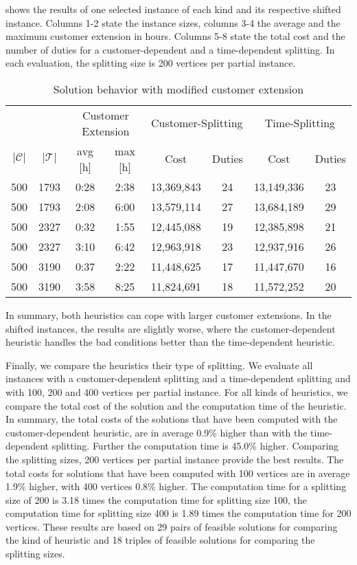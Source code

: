  shows the results of one selected instance of each kind and its respective shifted instance. Columns 1-2 state the instance sizes, columns 3-4 the average and the maximum customer extension in hours. Columns 5-8 state the total cost and the number of duties for a customer-dependent and a time-dependent splitting. In each evaluation, the splitting size is 200 vertices per partial instance.

\begin{table}[htb]
	\centering
	\begin{tabular}{cccc cc cc}
		\toprule
		&& \multicolumn{2}{c}{Customer Extension} & \multicolumn{2}{c}{Customer-Splitting} & \multicolumn{2}{c}{Time-Splitting} \\
		\cmidrule(r){3-8}
		$\vert\mathcal{C}\vert$ & $\vert\mathcal{T}\vert$ & avg [h] & max [h] & Cost & Duties & Cost & Duties \\
		\midrule
		500 & 1793 & 0:28 & 2:38 & 13,369,843 & 24 & 13,149,336 & 23 \\
		500 & 1793 & 2:08 & 6:00 & 13,579,114 & 27 & 13,684,189 & 29 \\
		500 & 2327 & 0:32 & 1:55 & 12,445,088 & 19 & 12,385,898 & 21 \\
		500 & 2327 & 3:10 & 6:42 & 12,963,918 & 23 & 12,937,916 & 26 \\
		500 & 3190 & 0:37 & 2:22 & 11,448,625 & 17 & 11,447,670 & 16 \\
		500 & 3190 & 3:58 & 8:25 & 11,824,691 & 18 & 11,572,252 & 20 \\
		\bottomrule
	\end{tabular}
	\caption{Solution behavior with modified customer extension}
	\label{tab:results:extension}
\end{table}

In summary, both heuristics can cope with larger customer extensions. In the shifted instances, the results are slightly worse, where the customer-dependent heuristic handles the bad conditions better than the time-dependent heuristic.

Finally, we compare the heuristics \wrt their type of splitting. We evaluate all instances with a customer-dependent splitting and a time-dependent splitting and with 100, 200 and 400 vertices per partial instance. For all kinds of heuristics, we compare the total cost of the solution and the computation time of the heuristic. In summary, the total costs of the solutions that have been computed with the customer-dependent heuristic, are in average 0.9\% higher than with the time-dependent splitting. Further the computation time is 45.0\% higher. Comparing the splitting sizes, 200 vertices per partial instance provide the best results. The total costs for solutions that have been computed with 100 vertices are in average 1.9\% higher, with 400 vertices 0.8\% higher. The computation time for a splitting size of 200 is 3.18 times the computation time for splitting size 100, the computation time for splitting size 400 is 1.89 times the computation time for 200 vertices. These results are based on 29 pairs of feasible solutions for comparing the kind of heuristic and 18 triples of feasible solutions for comparing the splitting sizes.

